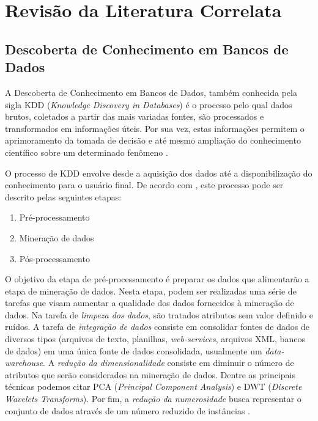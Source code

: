 \section{Revisão da Literatura Correlata} \label{sec:fundamentacao_teorica}

\subsection{Descoberta de Conhecimento em Bancos de Dados}
	\label{subsec:descoberta_conhecimento_bd}

A Descoberta de Conhecimento em Bancos de Dados, também conhecida pela sigla KDD 
(\emph{Knowledge Discovery in Databases}) é o processo pelo qual dados brutos,
coletados a partir das mais variadas fontes, são processados e transformados em
informações úteis. Por sua vez, estas informações permitem o aprimoramento da
tomada de decisão e até mesmo ampliação do conhecimento científico sobre um
determinado fenômeno \cite{tan2009introducao}.

O processo de KDD envolve desde a aquisição dos dados até a disponibilização do
conhecimento para o usuário final. De acordo com \cite{tan2009introducao},
este processo pode ser descrito pelas seguintes etapas:

\begin{enumerate}
    \item Pré-processamento
    \item Mineração de dados
    \item Pós-processamento
\end{enumerate}

O objetivo da etapa de pré-processamento é preparar os dados que alimentarão a 
etapa de mineração de dados. Nesta etapa, podem ser realizadas uma série de
tarefas que visam aumentar a qualidade dos dados fornecidos à mineração de
dados. Na tarefa de \emph{limpeza dos dados}, são tratados atributos sem valor
definido e ruídos. A tarefa de \emph{integração de dados} consiste
em consolidar fontes de dados de diversos tipos (arquivos de texto, planilhas,
\emph{web-services}, arquivos XML, bancos de dados) em uma única fonte de dados
consolidada, usualmente um \emph{data-warehouse}. A \emph{redução da
dimensionalidade} consiste em diminuir o número de atributos que serão
considerados na mineração de dados. Dentre as principais técnicas podemos citar
PCA (\emph{Principal Component Analysis}) e DWT (\emph{Discrete Wavelets
Transforms}). Por fim, a \emph{redução da numerosidade} busca representar o
conjunto de dados através de um número reduzido de instâncias
\cite{han2011data}.                                                   








